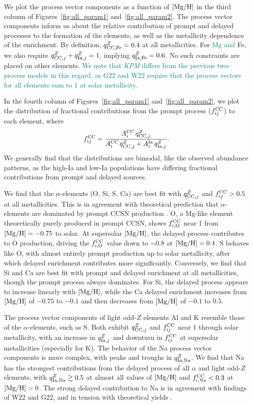 \documentclass[modern]{aastex631}
\newcommand{\mgh}{[{\rm Mg}/{\rm H}]}
\newcommand{\qcc}{q_{{\rm CC,}j}^{Z}}
\newcommand{\qccFe}{q_{{\rm CC, Fe}}^{Z}}
\newcommand{\qIa}{q_{{\rm Ia,}j}^{Z}}
\newcommand{\qIaFe}{q_{{\rm Ia,Fe}}^{Z}}
\newcommand{\Acc}{A^{\rm CC}_{i}}
\newcommand{\AIa}{A^{\rm Ia}_{i}}
\newcommand{\fcc}{f_{ij}^{\rm CC}}
\newcommand{\qIaX}[1]{q_{{\rm Ia, #1}}^{Z}}
\newcommand{\fccX}[1]{f_{i, {\rm #1}}^{\rm CC}}
\newcommand{\add}[1]{\textcolor{teal}{#1}}
\newcommand{\name}{\textsl{KPM}}
\begin{document}
We plot the process vector components as a function of $\mgh$ in the third column of Figures~\ref{fig:all_param1} and~\ref{fig:all_param2}. The process vector components inform us about the relative contribution of prompt and delayed processes to the formation of the elements, as well as the metallicity dependence of the enrichment. By definition, $\qccFe=0.4$ at all metallicities. For \add{Mg and} Fe, we also require $\qcc + \qIa = 1$, implying $\qIaFe=0.6$. No such constraints are placed on other elements. \add{We note that \name{} differs from the previous two-process models in this regard, as G22 and W22 require that the process vectors for all elements sum to 1 at solar metallicity.}

In the fourth column of Figures~\ref{fig:all_param1} and~\ref{fig:all_param2}, we plot the distribution of fractional contributions from the prompt process ($\fcc$) to each element, where
\begin{equation}\label{eq:fcc}
    \fcc = \frac{\Acc \, \qcc}{\Acc \, \qcc + \AIa \, \qIa}.
\end{equation}
We generally find that the distributions are bimodal, like the observed abundance patterns, as the high-Ia and low-Ia populations have differing fractional contributions from prompt and delayed sources.

We find that the $\alpha$-elements (O, Si, S, Ca) are best fit with $\qcc$ and $\fcc > 0.5$ at all metallicities. This is in agreement with theoretical prediction that $\alpha$-elements are dominated by prompt CCSN production \citep[e.g.][]{andrews2017}. O, a Mg-like element theoretically purely produced in prompt CCSN, shows $\fccX{O}$ near 1 from $\mgh=-0.75$ to solar. At supersolar $\mgh$, the delayed process contributes to O production, driving the $\fccX{O}$ value down to $\sim 0.8$ at $\mgh=0.4$. S behaves like O, with almost entirely prompt production up to solar metallicity, after which delayed enrichment contributes more significantly. Conversely, we find that Si and Ca are best fit with prompt and delayed enrichment at all metallicities, though the prompt process always dominates. For Si, the delayed process appears to increase linearly with $\mgh$, while the Ca delayed enrichment increases from $\mgh$ of $-0.75$ to $-0.1$ and then decreases from $\mgh$ of $-0.1$ to $0.5$.

The process vector components of light odd-$Z$ elements Al and K resemble those of the $\alpha$-elements, such as S. Both exhibit $\qcc$ and $\fcc$ near 1 through solar metallicity, with an increase in $\qIa$ and downturn in $\fcc$ at supersolar metallicities (especially for K). The behavior of the Na process vector components is more complex, with peaks and troughs in $\qIaX{Na}$. We find that Na has the strongest contributions from the delayed process of all $\alpha$ and light odd-$Z$ elements, with $\qIaX{Na} \gtrsim 0.5$ at almost all values of $\mgh$ and $\fccX{Na} < 0.3$ at $\mgh > 0$. The strong delayed contribution to Na is in agreement with findings of W22 and G22, and in tension with theoretical yields \citep[e.g.][]{andrews2017, rybizki2017}.
\end{document}
